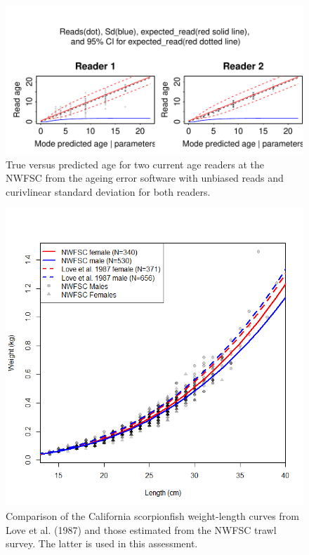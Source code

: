 \documentclass[12pt,]{article}
\begin{document}
\begin{figure}[htbp]
\centering
\includegraphics{Figures/Fleet8_NWFSCTrawl_ageerror2.pdf}
\caption{True versus predicted age for two current age readers at the
NWFSC from the ageing error software with unbiased reads and curivlinear
standard deviation for both readers.
\label{fig:Fleet8_NWFSCTrawl_ageerror2}}
\end{figure}

\begin{figure}[htbp]
\centering
\includegraphics{Figures/Length_weight.png}
\caption{Comparison of the California scorpionfish weight-length curves
from Love et al. (1987) and those estimated from the NWFSC trawl survey.
The latter is used in this assessment. \label{fig:Length_weight}}
\end{figure}
\end{document}
